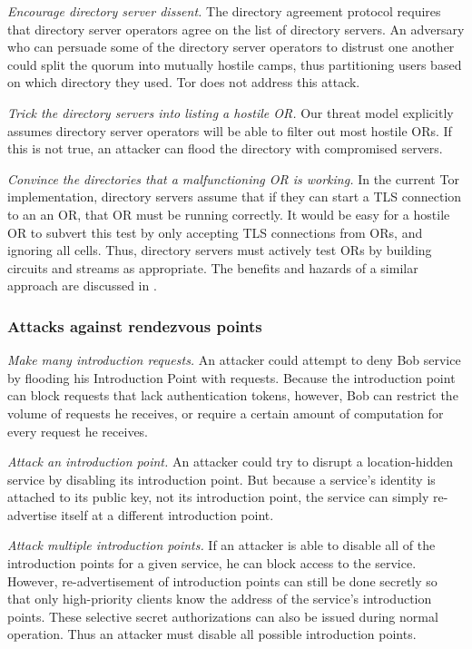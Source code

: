 \documentclass[times,10pt,twocolumn]{article}
\begin{document}
\emph{Encourage directory server dissent.}  The directory
agreement protocol requires that directory server operators agree on 
the list of directory servers.  An adversary who can persuade some
of the directory server operators to distrust one another could
split the quorum into mutually hostile camps, thus partitioning
users based on which directory they used.  Tor does not address
this attack.

\emph{Trick the directory servers into listing a hostile OR.}
Our threat model explicitly assumes directory server operators will
be able to filter out most hostile ORs.  If this is not true, an
attacker can flood the directory with compromised servers.

\emph{Convince the directories that a malfunctioning OR is
working.}  In the current Tor implementation, directory servers
assume that if they can start a TLS connection to an an OR, that OR
must be running correctly.  It would be easy for a hostile OR to
subvert this test by only accepting TLS connections from ORs, and
ignoring all cells. Thus, directory servers must actively test ORs
by building circuits and streams as appropriate.  The benefits and
hazards of a similar approach are discussed in \cite{mix-acc}.
  
\subsubsection*{Attacks against rendezvous points}

\emph{Make many introduction requests.}  An attacker could
attempt to deny Bob service by flooding his Introduction Point with
requests.  Because the introduction point can block requests that
lack authentication tokens, however, Bob can restrict the volume of
requests he receives, or require a certain amount of computation for
every request he receives.
  
\emph{Attack an introduction point.} An attacker could try to
disrupt a location-hidden service by disabling its introduction
point.  But because a service's identity is attached to its public
key, not its introduction point, the service can simply re-advertise
itself at a different introduction point.

\emph{Attack multiple introduction points.}  If an attacker is
able to disable all of the introduction points for a given service,
he can block access to the service. However, re-advertisement of
introduction points can still be done secretly so that only
high-priority clients know the address of the service's introduction
points. These selective secret authorizations can also be issued
during normal operation. Thus an attacker must disable
all possible introduction points.
\end{document}
